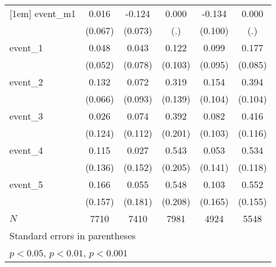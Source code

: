 {\begin{tabular}{l*{5}{c}}
[1em]
event\_m1    &       0.016         &      -0.124         &       0.000         &      -0.134         &       0.000         \\
            &     (0.067)         &     (0.073)         &         (.)         &     (0.100)         &         (.)         \\
[1em]
event\_1     &       0.048         &       0.043         &       0.122         &       0.099         &       0.177\sym{*}  \\
            &     (0.052)         &     (0.078)         &     (0.103)         &     (0.095)         &     (0.085)         \\
[1em]
event\_2     &       0.132\sym{*}  &       0.072         &       0.319\sym{*}  &       0.154         &       0.394\sym{***}\\
            &     (0.066)         &     (0.093)         &     (0.139)         &     (0.104)         &     (0.104)         \\
[1em]
event\_3     &       0.026         &       0.074         &       0.392         &       0.082         &       0.416\sym{***}\\
            &     (0.124)         &     (0.112)         &     (0.201)         &     (0.103)         &     (0.116)         \\
[1em]
event\_4     &       0.115         &       0.027         &       0.543\sym{**} &       0.053         &       0.534\sym{***}\\
            &     (0.136)         &     (0.152)         &     (0.205)         &     (0.141)         &     (0.118)         \\
[1em]
event\_5     &       0.166         &       0.055         &       0.548\sym{**} &       0.103         &       0.552\sym{***}\\
            &     (0.157)         &     (0.181)         &     (0.208)         &     (0.165)         &     (0.155)         \\
\hline
\(N\)       &        7710         &        7410         &        7981         &        4924         &        5548         \\
\hline\hline
\multicolumn{6}{l}{\footnotesize Standard errors in parentheses}\\
\multicolumn{6}{l}{\footnotesize \sym{*} \(p<0.05\), \sym{**} \(p<0.01\), \sym{***} \(p<0.001\)}\\
\end{tabular}
}
